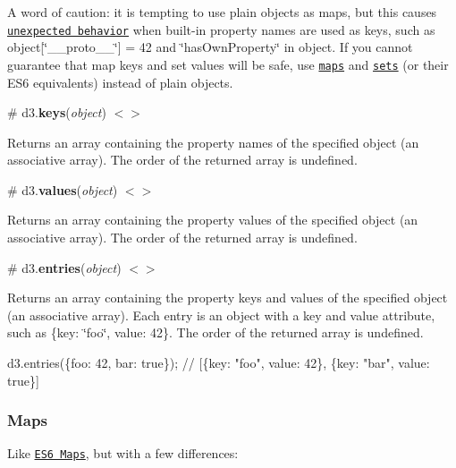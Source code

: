 A word of caution\+: it is tempting to use plain objects as maps, but this causes \href{http://www.devthought.com/2012/01/18/an-object-is-not-a-hash/}{\tt unexpected behavior} when built-\/in property names are used as keys, such as {\ttfamily object\mbox{[}\char`\"{}\+\_\+\+\_\+proto\+\_\+\+\_\+\char`\"{}\mbox{]} = 42} and {\ttfamily \char`\"{}has\+Own\+Property\char`\"{} in object}. If you cannot guarantee that map keys and set values will be safe, use \href{#maps}{\tt maps} and \href{#sets}{\tt sets} (or their E\+S6 equivalents) instead of plain objects.

\label{_keys}%
\# d3.{\bfseries keys}({\itshape object}) \href{https://github.com/d3/d3-collection/blob/master/src/keys.js}{\tt $<$$>$}

Returns an array containing the property names of the specified object (an associative array). The order of the returned array is undefined.

\label{_values}%
\# d3.{\bfseries values}({\itshape object}) \href{https://github.com/d3/d3-collection/blob/master/src/values.js}{\tt $<$$>$}

Returns an array containing the property values of the specified object (an associative array). The order of the returned array is undefined.

\label{_entries}%
\# d3.{\bfseries entries}({\itshape object}) \href{https://github.com/d3/d3-collection/blob/master/src/entries.js}{\tt $<$$>$}

Returns an array containing the property keys and values of the specified object (an associative array). Each entry is an object with a key and value attribute, such as {\ttfamily \{key\+: \char`\"{}foo\char`\"{}, value\+: 42\}}. The order of the returned array is undefined.


\begin{DoxyCode}
d3.entries(\{foo: 42, bar: true\}); // [\{key: "foo", value: 42\}, \{key: "bar", value: true\}]
\end{DoxyCode}


\subsubsection*{Maps}

Like \href{https://developer.mozilla.org/en-US/docs/Web/JavaScript/Reference/Global_Objects/Map}{\tt E\+S6 Maps}, but with a few differences\+:


